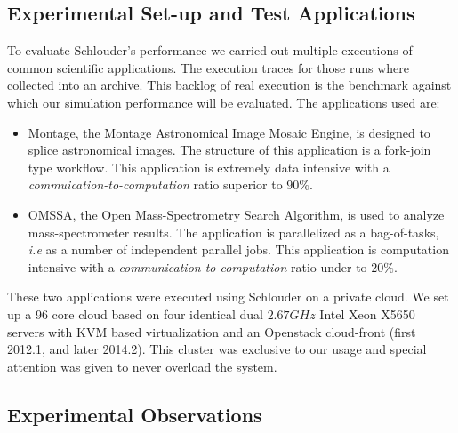 \documentclass[10pt,conference,compsocconf]{IEEEtran}
\begin{document}
\subsection{Experimental Set-up and Test Applications}\label{sc:setup}

To evaluate Schlouder's performance we carried out multiple executions of
common scientific applications. The execution traces for those runs where
collected into an archive. This backlog of real execution is the benchmark
against which our simulation performance will be evaluated. The applications
used are:

\begin{itemize}
	\item Montage\cite{montage2009}, the Montage Astronomical Image Mosaic
		Engine, is designed to splice astronomical images. The structure
                of this application is a fork-join type workflow. This
                application  is extremely data intensive with a
		\emph{commuication-to-computation} ratio superior to $90\%$.
	\item OMSSA\cite{Geer2004}, the Open Mass-Spectrometry Search Algorithm, 
		is used to analyze mass-spectrometer results. The application is
                parallelized as a bag-of-tasks, \textit{i.e} as a number of
                independent parallel jobs. This application is
		computation intensive with a
		\emph{communication-to-computation} ratio under to $20\%$.
\end{itemize}

These two applications were executed using Schlouder on a private cloud.  We set
up a 96 core cloud based on four identical  dual $2.67GHz$ Intel Xeon X5650
servers with KVM based virtualization  and an Openstack cloud-front (first
2012.1, and later 2014.2). This cluster was exclusive to our usage and special
attention was given to never overload the system.

\subsection{Experimental Observations}
\end{document}
